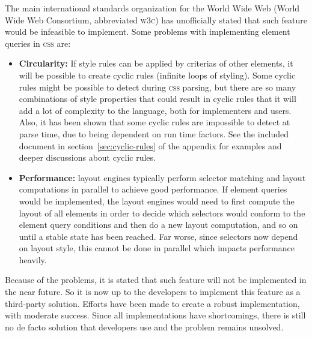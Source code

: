 \documentclass[a4paper,11pt]{kth-mag}
\begin{document}
      The main international standards organization for the World Wide Web (World Wide Web Consortium, abbreviated \textsc{w3c}) has unofficially stated that such feature would be infeasible to implement.
      Some problems with implementing element queries in \textsc{css} are:
      \begin{itemize}
        \item \textbf{Circularity:}
        If style rules can be applied by criterias of other elements, it will be possible to create cyclic rules (infinite loops of styling).
        Some cyclic rules might be possible to detect during \textsc{css} parsing, but there are so many combinations of style properties that could result in cyclic rules that it will add a lot of complexity to the language, both for implementers and users.
        Also, it has been shown that some cyclic rules are impossible to detect at parse time, due to being dependent on run time factors.
        See the included document in section~\ref{sec:cyclic-rules} of the appendix for examples and deeper discussions about cyclic rules.
        \item \textbf{Performance:} 
        layout engines typically perform selector matching and layout computations in parallel to achieve good performance.
        If element queries would be implemented, the layout engines would need to first compute the layout of all elements in order to decide which selectors would conform to the element query conditions and then do a new layout computation, and so on until a stable state has been reached.
        Far worse, since selectors now depend on layout style, this cannot be done in parallel which impacts performance heavily.
      \end{itemize}
      Because of the problems, it is stated that such feature will not be implemented in the near future. So it is now up to the developers to implement this feature as a third-party solution.
      Efforts have been made to create a robust implementation, with moderate success.
      Since all implementations have shortcomings, there is still no de facto solution that developers use and the problem remains unsolved.
\end{document}
